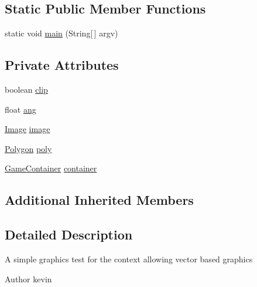\subsection*{Static Public Member Functions}
\begin{DoxyCompactItemize}
\item 
static void \mbox{\hyperlink{classorg_1_1newdawn_1_1slick_1_1tests_1_1_graphics_test_a62bbd7544fd5ecc0c156f06ff518a804}{main}} (String\mbox{[}$\,$\mbox{]} argv)
\end{DoxyCompactItemize}
\subsection*{Private Attributes}
\begin{DoxyCompactItemize}
\item 
boolean \mbox{\hyperlink{classorg_1_1newdawn_1_1slick_1_1tests_1_1_graphics_test_a45883b25988c6ce31f644d342ab168f3}{clip}}
\item 
float \mbox{\hyperlink{classorg_1_1newdawn_1_1slick_1_1tests_1_1_graphics_test_a4ed9f283437a082c3e14f94968f7cf70}{ang}}
\item 
\mbox{\hyperlink{classorg_1_1newdawn_1_1slick_1_1_image}{Image}} \mbox{\hyperlink{classorg_1_1newdawn_1_1slick_1_1tests_1_1_graphics_test_a425fce4f6eef7e14bbe291e64d604fdf}{image}}
\item 
\mbox{\hyperlink{classorg_1_1newdawn_1_1slick_1_1geom_1_1_polygon}{Polygon}} \mbox{\hyperlink{classorg_1_1newdawn_1_1slick_1_1tests_1_1_graphics_test_a3427e7e0650177a34f0a1df767f15720}{poly}}
\item 
\mbox{\hyperlink{classorg_1_1newdawn_1_1slick_1_1_game_container}{Game\+Container}} \mbox{\hyperlink{classorg_1_1newdawn_1_1slick_1_1tests_1_1_graphics_test_a5484b72803a02c8eba6188f08e274f32}{container}}
\end{DoxyCompactItemize}
\subsection*{Additional Inherited Members}


\subsection{Detailed Description}
A simple graphics test for the context allowing vector based graphics

\begin{DoxyAuthor}{Author}
kevin 
\end{DoxyAuthor}


